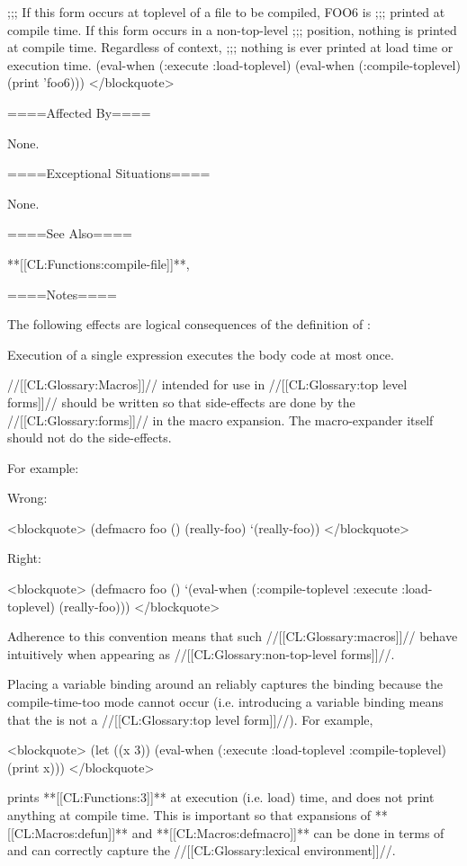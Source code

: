 ;;; If this form occurs at toplevel of a file to be compiled, FOO6 is ;;; printed at compile time. If this form occurs in a non-top-level ;;; position, nothing is printed at compile time. Regardless of context, ;;; nothing is ever printed at load time or execution time. (eval-when (:execute :load-toplevel) (eval-when (:compile-toplevel) (print 'foo6))) </blockquote>

====Affected By====

None.

====Exceptional Situations====

None.

====See Also====

**[[CL:Functions:compile-file]]**, {\secref\Compilation}

====Notes====

The following effects are logical consequences of the definition of :

\beginlist \itemitem{\bull} Execution of a single  expression executes the body code at most once.

\itemitem{\bull} //[[CL:Glossary:Macros]]// intended for use in //[[CL:Glossary:top level forms]]// should be written so that side-effects are done by the //[[CL:Glossary:forms]]// in the macro expansion. The macro-expander itself should not do the side-effects.

For example:

Wrong:

<blockquote> (defmacro foo () (really-foo) `(really-foo)) </blockquote>

Right:

<blockquote> (defmacro foo () `(eval-when (:compile-toplevel :execute :load-toplevel) (really-foo))) </blockquote>

Adherence to this convention means that such //[[CL:Glossary:macros]]// behave intuitively when appearing as //[[CL:Glossary:non-top-level forms]]//.

\itemitem{\bull} Placing a variable binding around an  reliably captures the binding because the compile-time-too mode cannot occur (i.e. introducing a variable binding means that the  is not a //[[CL:Glossary:top level form]]//). For example,

<blockquote> (let ((x 3)) (eval-when (:execute :load-toplevel :compile-toplevel) (print x))) </blockquote>

prints **[[CL:Functions:3]]** at execution (i.e. load) time, and does not print anything at compile time. This is important so that expansions of **[[CL:Macros:defun]]** and **[[CL:Macros:defmacro]]** can be done in terms of  and can correctly capture the //[[CL:Glossary:lexical environment]]//.

